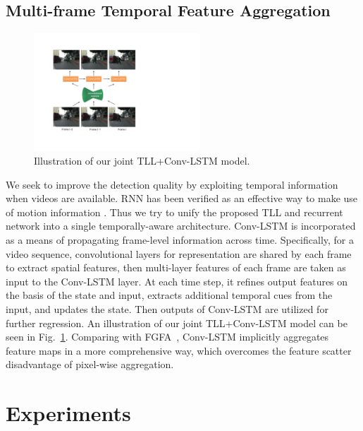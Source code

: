 \documentclass[runningheads]{llncs}
\begin{document}
\subsection{Multi-frame Temporal Feature Aggregation}
\begin{figure}[t]
	\centering
	\includegraphics[height=4.4cm]{6_lstm.pdf}
	\caption{Illustration of our joint TLL+Conv-LSTM model.}
	\label{fig6}
\end{figure}
We seek to improve the detection quality by exploiting temporal information when videos are available. RNN has been verified as an effective way to make use of motion information \cite{VC,VAR}. Thus we try to unify the proposed TLL and recurrent network into a single temporally-aware architecture. Conv-LSTM \cite{ConvLSTM} is incorporated as a means of propagating frame-level information across time. Specifically, for a video sequence, convolutional layers for representation are shared by each frame to extract spatial features, then multi-layer features of each frame are taken as input to the Conv-LSTM layer. At each time step, it refines output features on the basis of the state and input, extracts additional temporal cues from the input, and updates the state. Then outputs of Conv-LSTM are utilized for further regression. An illustration of our joint TLL+Conv-LSTM model can be seen in Fig.~\ref{fig6}. Comparing with FGFA~\cite{FGFA}, Conv-LSTM implicitly aggregates feature maps in a more comprehensive way, which overcomes the feature scatter disadvantage of pixel-wise aggregation.

\section{Experiments}
\end{document}
